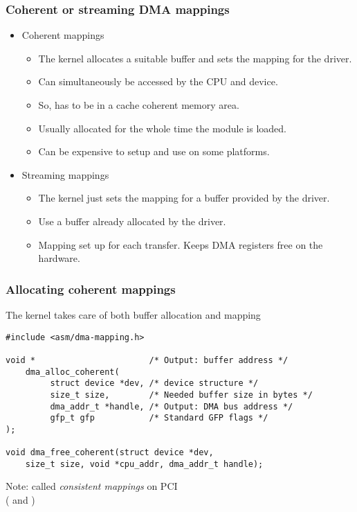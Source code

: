 \begin{frame}
  \frametitle{Coherent or streaming DMA mappings}
  \begin{itemize}
  \item Coherent mappings
    \begin{itemize}
    \item The kernel allocates a suitable buffer and sets the mapping
      for the driver.
    \item Can simultaneously be accessed by the CPU and device.
    \item So, has to be in a cache coherent memory area.
    \item Usually allocated for the whole time the module is loaded.
    \item Can be expensive to setup and use on some platforms.
    \end{itemize}
  \item Streaming mappings
    \begin{itemize}
    \item The kernel just sets the mapping for a buffer provided by
      the driver.
    \item Use a buffer already allocated by the driver.
    \item Mapping set up for each transfer. Keeps DMA registers free
      on the hardware.
    \end{itemize}
  \end{itemize}
\end{frame}

\begin{frame}[fragile]
  \frametitle{Allocating coherent mappings}
  The kernel takes care of both buffer allocation and mapping
\begin{verbatim}
#include <asm/dma-mapping.h>

void *                       /* Output: buffer address */
    dma_alloc_coherent(
         struct device *dev, /* device structure */
         size_t size,        /* Needed buffer size in bytes */
         dma_addr_t *handle, /* Output: DMA bus address */
         gfp_t gfp           /* Standard GFP flags */
);

void dma_free_coherent(struct device *dev,
    size_t size, void *cpu_addr, dma_addr_t handle);
\end{verbatim}
Note: called {\em consistent mappings} on PCI\\
( and )
\end{frame}

